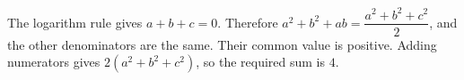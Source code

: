 The logarithm rule gives $a+b+c=0$. Therefore $a^2+b^2+ab=\dfrac{a^2+b^2+c^2}{2}$, and the other denominators are the same. Their common value is positive. Adding numerators gives $2(a^2+b^2+c^2)$, so the required sum is $\boxed4$.
